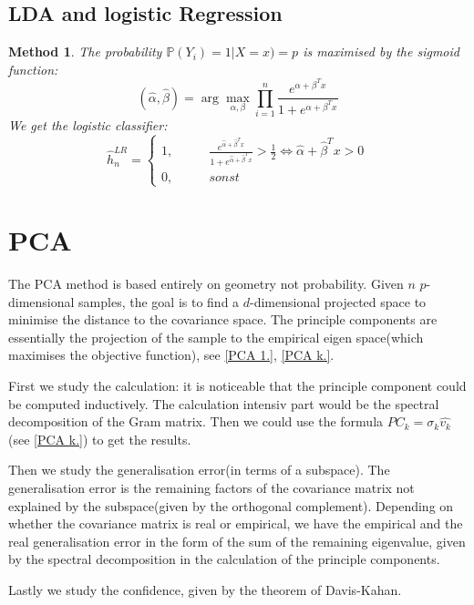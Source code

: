 \documentclass[a4paper,12pt, oneside, fleqn]{book}
\newtheorem{method}[theorem]{Method}
\theoremstyle{definition}
\theoremstyle{remark}
\begin{document}
\subsection{LDA and logistic Regression}
\begin{method}
The probability $\mathbb{P}(Y_i) = 1 | X = x) = p$ is maximised by the sigmoid function:
\begin{equation*}
	(\hat{\alpha}, \hat{\beta}) = \arg \max_{\alpha, \beta} \prod_{i = 1}^n \frac{e^{\alpha + \beta^Tx}}{1 + e^{\alpha + \beta^Tx}}
\end{equation*}
We get the logistic classifier:
\begin{equation*}
	\hat{h}_n^{LR} = 
	\left\{\begin{aligned}
		  1, \qquad &\frac{e^{\hat{\alpha} + \hat{\beta}^Tx}}{1 + e^{\hat{\alpha} + \hat{\beta}^Tx}} > \frac{1}{2} \Leftrightarrow \hat{\alpha} + \hat{\beta}^Tx > 0\\
		  0, \qquad &sonst
	\end{aligned}\right.
\end{equation*}	
\end{method}



\section{PCA}
The PCA method is based entirely on geometry not probability. Given $n$ $p$-dimensional samples, the goal is to find a $d$-dimensional projected space to minimise the distance to the covariance space. The principle components are essentially the projection of the sample to the empirical eigen space(which maximises the objective function), see \ref{PCA 1.}, \ref{PCA k.}. \par 
First we study the calculation: it is noticeable that the principle component could be computed inductively. The calculation intensiv part would be the spectral decomposition of the Gram matrix. Then we could use the formula $PC_k = \sigma_k \hat{v_k}$(see \ref{PCA k.}) to get the results. \par 
Then we study the generalisation error(in terms of a subspace). The generalisation error is the remaining factors of the covariance matrix not explained by the subspace(given by the orthogonal complement). Depending on whether the covariance matrix is real or empirical, we have the empirical and the real generalisation error in the form of the sum of the remaining eigenvalue, given by the spectral decomposition in the calculation of the principle components. \par 
Lastly we study the confidence, given by the theorem of Davis-Kahan. 
\end{document}
